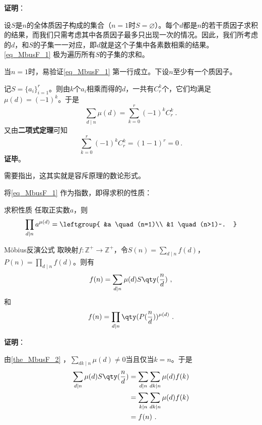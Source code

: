 \textbf{证明}：

设$S$是$n$的全体质因子构成的集合（$n=1$时$S=\varnothing$）。每个$d$都是$n$的若干质因子求积的结果，而我们只需考虑其中各质因子最多只出现一次的情况。因此，我们所考虑的$d$，和$S$的子集一一对应，即$d$就是这个子集中各素数相乘的结果。\autoref{eq_MbusF_1} 极为遍历所有$S$的子集的求和。

当$n=1$时，易验证\autoref{eq_MbusF_1} 第一行成立。下设$n$至少有一个质因子。

记$S=\{a_i\}_{i=1}^r$。则由$k$个$a_i$相乘而得的$d$，一共有$C^k_r$个，它们均满足$\mu(d)=(-1)^k$。于是
\begin{equation}
\sum_{d\mid n}\mu(d)=\sum_{k=0}^r(-1)^kC^k_r~.
\end{equation}
又由\textbf{二项式定理}可知
\begin{equation}
\sum_{k=0}^r(-1)^kC^k_r=(1-1)^r=0~.
\end{equation}
\textbf{证毕}。

需要指出，这其实就是容斥原理的数论形式。

将\autoref{eq_MbusF_1} 作为指数，即得求积的性质：


\begin{corollary}{求积性质}\label{cor_MbusF_1}
任取正实数$a$，则
\begin{equation}
\prod_{d\mid n}a^{\mu(d)}=
\leftgroup{
    &a \quad (n=1)\\
    &1 \quad (n>1)~.
}
\end{equation}
\end{corollary}






\begin{theorem}{Möbius反演公式}\label{the_MbusF_3}
取映射$f:\mathbb{Z}^+\to\mathbb{Z}^+$，令$S(n)=\sum_{d\mid n}f(d)$，$P(n)=\prod_{d\mid n}f(d)$。则有
\begin{equation}
f(n) = \sum_{d\mid n}\mu(d)S\qty(\frac{n}{d})~,
\end{equation}
和
\begin{equation}
f(n) = \prod_{d\mid n}\qty(P(\frac{n}{d}))^{\mu(d)}~.
\end{equation}
\end{theorem}

\textbf{证明}：

由\autoref{the_MbusF_2} ，$\sum_{dk\mid n}\mu(d)\neq 0$当且仅当$k=n$。于是
\begin{equation}
\begin{aligned}
\sum_{d\mid n}\mu(d)S\qty(\frac{n}{d})&=\sum_{d\mid n}\sum_{dk\mid n}\mu(d)f(k)\\
&=\sum_{k\mid n}\sum_{dk\mid n}\mu(d)f(k)\\
&=f(n)~.
\end{aligned}
\end{equation}


